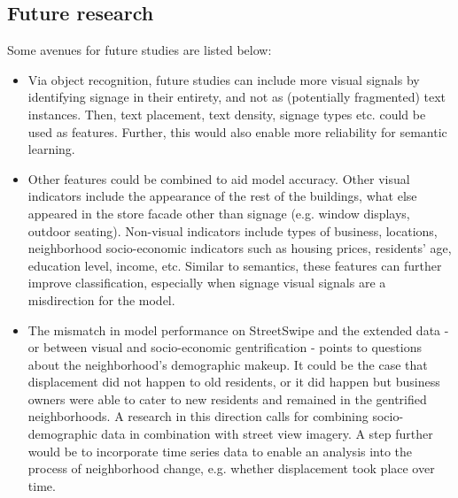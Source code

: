 \subsection{Future research}
Some avenues for future studies are listed below:
\begin{itemize}
    \item Via object recognition, future studies can include more visual signals by identifying signage in their entirety, and not as (potentially fragmented) text instances. Then, text placement, text density, signage types etc. could be used as features. Further, this would also enable more reliability for semantic learning.

    \item Other features could be combined to aid model accuracy. Other visual indicators include the appearance of the rest of the buildings, what else appeared in the store facade other than signage (e.g. window displays, outdoor seating). Non-visual indicators include types of business, locations, neighborhood socio-economic indicators such as housing prices, residents' age, education level, income, etc. Similar to semantics, these features can further improve classification, especially when signage visual signals are a misdirection for the model.
    
    \item The mismatch in model performance on StreetSwipe and the extended data - or between visual and socio-economic gentrification - points to questions about the neighborhood's demographic makeup. It could be the case that displacement did not happen to old residents, or it did happen but business owners were able to cater to new residents and remained in the gentrified neighborhoods. A research in this direction calls for combining socio-demographic data in combination with street view imagery. A step further would be to incorporate time series data to enable an analysis into the process of neighborhood change, e.g. whether displacement took place over time.
\end{itemize}
